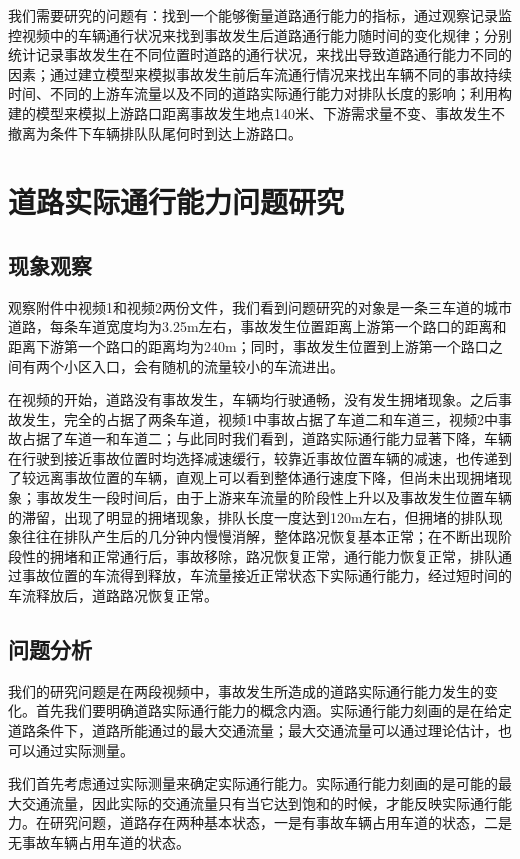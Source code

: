\documentclass{cumcmart}
\begin{document}
我们需要研究的问题有：找到一个能够衡量道路通行能力的指标，通过观察记录监控视频中的车辆通行状况来找到事故发生后道路通行能力随时间的变化规律；分别统计记录事故发生在不同位置时道路的通行状况，来找出导致道路通行能力不同的因素；通过建立模型来模拟事故发生前后车流通行情况来找出车辆不同的事故持续时间、不同的上游车流量以及不同的道路实际通行能力对排队长度的影响；利用构建的模型来模拟上游路口距离事故发生地点140米、下游需求量不变、事故发生不撤离为条件下车辆排队队尾何时到达上游路口。

\section{道路实际通行能力问题研究}
\subsection{现象观察}
观察附件中视频1和视频2两份文件，我们看到问题研究的对象是一条三车道的城市道路，每条车道宽度均为3.25m左右，事故发生位置距离上游第一个路口的距离和距离下游第一个路口的距离均为240m；同时，事故发生位置到上游第一个路口之间有两个小区入口，会有随机的流量较小的车流进出。

在视频的开始，道路没有事故发生，车辆均行驶通畅，没有发生拥堵现象。之后事故发生，完全的占据了两条车道，视频1中事故占据了车道二和车道三，视频2中事故占据了车道一和车道二；与此同时我们看到，道路实际通行能力显著下降，车辆在行驶到接近事故位置时均选择减速缓行，较靠近事故位置车辆的减速，也传递到了较远离事故位置的车辆，直观上可以看到整体通行速度下降，但尚未出现拥堵现象；事故发生一段时间后，由于上游来车流量的阶段性上升以及事故发生位置车辆的滞留，出现了明显的拥堵现象，排队长度一度达到120m左右，但拥堵的排队现象往往在排队产生后的几分钟内慢慢消解，整体路况恢复基本正常；在不断出现阶段性的拥堵和正常通行后，事故移除，路况恢复正常，通行能力恢复正常，排队通过事故位置的车流得到释放，车流量接近正常状态下实际通行能力，经过短时间的车流释放后，道路路况恢复正常。

\subsection{问题分析}
我们的研究问题是在两段视频中，事故发生所造成的道路实际通行能力发生的变化。首先我们要明确道路实际通行能力的概念内涵。实际通行能力刻画的是在给定道路条件下，道路所能通过的最大交通流量；最大交通流量可以通过理论估计，也可以通过实际测量。

我们首先考虑通过实际测量来确定实际通行能力。实际通行能力刻画的是可能的最大交通流量，因此实际的交通流量只有当它达到饱和的时候，才能反映实际通行能力。在研究问题，道路存在两种基本状态，一是有事故车辆占用车道的状态，二是无事故车辆占用车道的状态。
\end{document}
